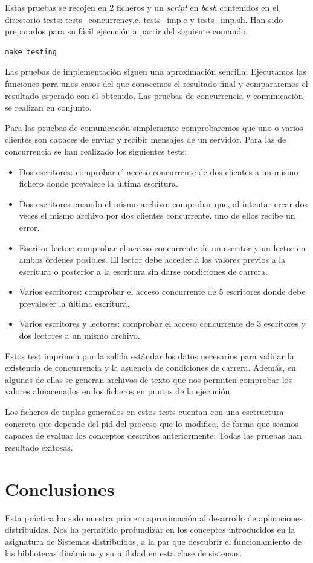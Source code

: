 \documentclass[]{article}
\begin{document}
Estas pruebas se recojen en 2 ficheros y un \textit{script} en \textit{bash} contenidos en el directorio tests: tests\_concurrency.c, tests\_imp.c y tests\_imp.sh. Han sido preparados para su fácil ejecución a partir del siguiente comando. 

\begin{lstlisting}[caption=Compiación y ejecución de tests]
make testing
\end{lstlisting}

Las pruebas de implementación siguen una aproximación sencilla. Ejecutamos las funciones para unos casos del que conocemos el resultado final y compararemos el resultado esperado con el obtenido. Las pruebas de concurrencia y comunicación se realizan en conjunto.

Para las pruebas de comunicación simplemente comprobaremos que uno o varios clientes son capaces de enviar y recibir mensajes de un servidor. Para las de concurrencia se han realizado los siguientes tests: 

\begin{itemize}
    \item Dos escritores: comprobar el acceso concurrente de dos clientes a un mismo fichero donde prevalece la última escritura. 
    \item Dos escritores creando el mismo archivo: comprobar que, al intentar crear dos veces el mismo archivo por dos clientes concurrente, uno de ellos recibe un error. 
    \item Escritor-lector: comprobar el acceso concurrente de un escritor y un lector en ambos órdenes posibles. El lector debe acceder a los valores previos a la escritura o posterior a la escritura sin darse condiciones de carrera. 
    \item Varios escritores: comprobar el acceso concurrente de 5 escritores donde debe prevalecer la última escritura. 
    \item Varios escritores y lectores: comprobar el acceso concurrente de 3 escritores y dos lectores a un mismo archivo. 
\end{itemize}

Estos test imprimen por la salida estándar los datos necesarios para validar la existencia de concurrencia y la asuencia de condiciones de carrera. Además, en algunas de ellas se generan archivos de texto que nos permiten comprobar los valores almacenados en los ficheros en puntos de la ejecución. 

Los ficheros de tuplas generados en estos tests cuentan con una esctructura concreta que depende del pid del proceso que lo modifica, de forma que seamos capaces de evaluar los conceptos descritos anteriormente. Todas las pruebas han resultado exitosas. 

\section{Conclusiones}
\label{sec:conclusiones}
Esta práctica ha sido nuestra primera aproximación al desarrollo de aplicaciones distribuídas. Nos ha permitido profundizar en los conceptos introducidos en la asignatura de Sistemas distribuídos, a la par que descubrir el funcionamiento de las bibliotecas dinámicas y su utilidad en esta clase de sistemas.
\end{document}
